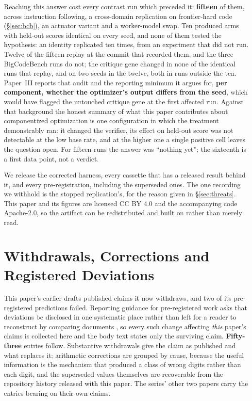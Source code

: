 \documentclass[11pt]{article}
\begin{document}
Reaching this answer cost every contrast run which preceded it: \textbf{fifteen} of them, across
instruction following, a cross-domain replication on frontier-hard code (\S\ref{sec:bcb}), an
actuator variant and a worker-model swap. Ten produced arms with held-out scores identical on every
seed, and none of them tested the hypothesis: an identity replicated ten times, from an
experiment that did not run. Twelve of the fifteen replay at the commit that recorded them, and
the three BigCodeBench runs do not; the critique gene changed in none of the identical runs that
replay, and on two seeds in the twelve, both in runs outside the ten. Paper~III reports that
audit and the reporting minimum it argues for, \textbf{per component, whether the optimizer's
output differs from the seed}, which would have flagged the untouched critique gene at the first
affected run. Against that background the honest summary of what this paper contributes about
componentized optimization is one configuration in which the treatment demonstrably ran: it
changed the verifier, its effect on held-out score was not detectable at the low base rate, and
at the higher one a single positive cell leaves the question open. For fifteen runs the answer was
``nothing yet''; the sixteenth is a first data point, not a verdict.

We release the corrected harness, every cassette that has a released result behind it, and
every pre-registration, including the superseded ones. The one recording we withhold is the
stopped replication's, for the reason given in \S\ref{sec:threats}. This paper and its figures are licensed CC BY 4.0 and the accompanying code Apache-2.0, so
the artifact can be redistributed and built on rather than merely read.




\appendix

\section{Withdrawals, Corrections and Registered Deviations}
\label{sec:corrections}

This paper's earlier drafts published claims it now withdraws, and two of its pre-registered
predictions failed. Reporting guidance for pre-registered work asks that deviations be disclosed in
one systematic place rather than left for a reader to reconstruct by comparing documents
\citep{willroth2024bestlaid}, so every such change affecting \emph{this} paper's claims is
collected here and the body text states only the surviving claim.
\textbf{Fifty-three} entries follow.
Substantive withdrawals give the claim as
published and what replaces it; arithmetic corrections are grouped by cause, because the useful
information is the mechanism that produced a class of wrong digits rather than each digit, and the
superseded values themselves are recoverable from the repository history released with this paper.
The series' other two papers carry the entries bearing on their own claims.
\end{document}
